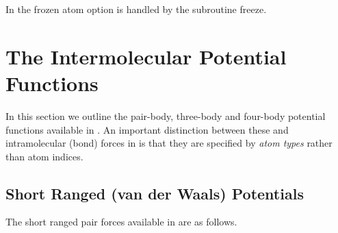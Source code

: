 In \D{} the frozen atom option is handled by the subroutine {\sc freeze}.


\section{The Intermolecular Potential Functions}
\label{intermolecular}
In this section we outline the pair-body, three-body and four-body
potential functions available in \D{}. An important distinction between
these and intramolecular (bond) forces in \D{} is that they are
specified by {\em atom types} rather than atom indices.

\subsection{Short Ranged (van der Waals) Potentials}
\label{vdwpot}

The short ranged pair forces available in \D{} are as
follows.

